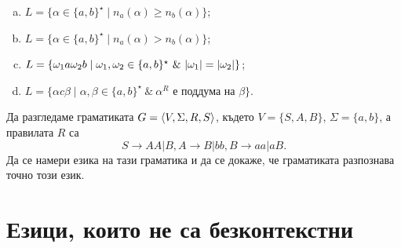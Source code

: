 \begin{problem}
\begin{enumerate}[a)]
  \item
    $L = \{\alpha \in \{a,b\}^\star\mid n_a(\alpha) \geq n_b(\alpha)\}$;
  \item
    $L = \{\alpha \in \{a,b\}^\star\mid n_a(\alpha) > n_b(\alpha)\}$;
  \item
    $L = \{\omega_1 a \omega_2 b \mid \omega_1,\omega_2 \in \{a,b\}^\star\ \&\ \lvert{\omega_1}\rvert = \lvert{\omega_2}\rvert\}$;
  \item
    $L = \{\alpha c \beta \mid \alpha,\beta \in \{a,b\}^\star\ \&\ \alpha^R\mbox{ е поддума на }\beta \}$.
  \end{enumerate}
\end{problem}

\begin{problem}
  Да разгледаме граматиката $G = \langle{V,\Sigma,R,S}\rangle$, където  $V = \{S,A,B\}$, $\Sigma = \{a,b\}$, а правилата $R$ са
  \[S \to AA | B, A \to B | bb, B \to aa | aB.\]
  Да се намери езика на тази граматика и да се докаже, че граматиката разпознава точно този език.
\end{problem}

\section{Езици, които не са безконтекстни}


